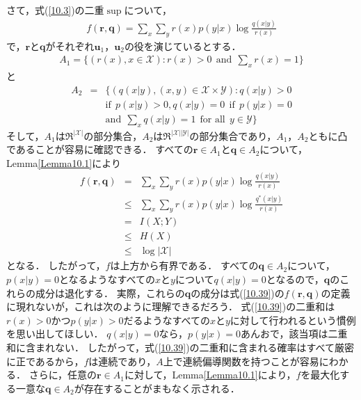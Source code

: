 \documentclass{ltjsarticle}
\theoremstyle{definition}
\begin{document}
さて，式(\ref{10.3})の二重$\sup$について，
\begin{eqnarray}
  \label{10.39}
  f(\mathbf{r}, \mathbf{q}) = \sum_{x} \sum_{y} r(x) p(y|x) \log \frac{q(x|y)}{r(x)}
\end{eqnarray}
で，$\mathbf{r}$と$\mathbf{q}$がそれぞれ$\mathbf{u}_1$，$\mathbf{u}_2$の役を演じているとする．
\begin{eqnarray}
  \label{10.40}
  A_1 = \{ ( r(x), x \in \mathcal{X} ) : r(x) > 0 \ \ \mbox{and} \ \  \sum_{x} r(x) = 1 \}
\end{eqnarray}
と
\begin{eqnarray}
  \label{10.41}
  A_2 &=& \{ \left( q(x|y), (x,y) \in \mathcal{X} \times \mathcal{Y} \right) : q(x|y) > 0 \nonumber \\
  && \mbox{if} \ \  p(x|y) > 0, q(x|y) = 0 \ \ \mbox{if} \ \ p(y|x) = 0 \nonumber \\
  && \mbox{and} \ \ \sum_{x} q(x|y) = 1 \ \ \mbox{for all} \ \ y \in \mathcal{Y} \}
\end{eqnarray}
そして，$A_1$は$\mathfrak{R}^{| \mathcal{X} |}$の部分集合，$A_2$は$\mathfrak{R}^{|\mathcal{X}| |\mathcal{Y}|}$の部分集合であり，$A_1$，$A_2$ともに凸であることが容易に確認できる．
すべての$\mathbf{r} \in A_1$と$\mathbf{q} \in A_2$について，Lemma\ref{Lemma10.1}により
\begin{eqnarray}
  \label{10.42}
  f(\mathbf{r}, \mathbf{q}) &=& \sum_{x} \sum_{y} r(x) p(y|x) \log \frac{q(x|y)}{r(x)} \\
  \label{10.43}
  &\leq& \sum_{x} \sum_{y} r(x) p(y|x) \log \frac{q^*(x|y)}{r(x)} \\
  \label{10.44}
  &=& I(X;Y) \\
  \label{10.45}
  &\leq& H(X) \\
  \label{10.46}
  &\leq& \log | \mathcal{X} |
\end{eqnarray}
となる．
したがって，$f$は上方から有界である．
すべての$\mathbf{q} \in A_2$について，$p(x|y)=0$となるようなすべての$x$と$y$について$q(x|y)=0$となるので，$\mathbf{q}$のこれらの成分は退化する．
実際，これらの$\mathbf{q}$の成分は式(\ref{10.39})の$f(\mathbf{r}, \mathbf{q})$の定義に現れないが，これは次のように理解できるだろう．
式(\ref{10.39})の二重和は$r(x)>0$かつ$p(y|x)>0$だるようなすべての$x$と$y$に対して行われるという慣例を思い出してほしい．
$q(x|y)=0$なら，$p(y|x)=0$あんおで，該当項は二重和に含まれない．
したがって，式(\ref{10.39})の二重和に含まれる確率はすべて厳密に正であるから，$f$は連続であり，$A$上で連続偏導関数を持つことが容易にわかる．
さらに，任意の$\mathbf{r} \in A_1$に対して，Lemma\ref{Lemma10.1}により，$f$を最大化する一意な$\mathbf{q} \in A_2$が存在することがまもなく示される．
\end{document}
